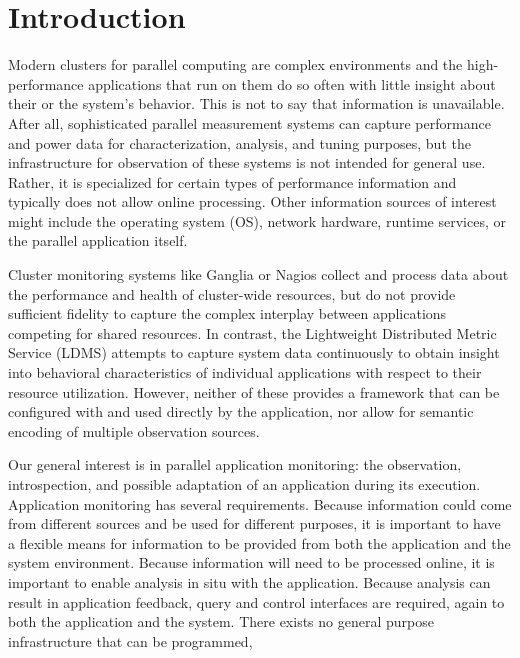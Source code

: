 \section{Introduction}
%
\par
%
Modern clusters for parallel computing are complex environments and
the high-performance applications that run on them do so often with
little insight about their or the system's behavior.
%
This is not to say that information is unavailable.  After all,
sophisticated parallel measurement systems can capture performance and
power data for characterization, analysis, and tuning purposes, but
the infrastructure for observation of these systems is not intended
for general use.
%
Rather, it is specialized for certain types of performance information
and typically does not allow online processing.
%
Other information sources of interest might include the
operating system (OS), network hardware, runtime services, or the
parallel application itself.
%
\par
%
Cluster monitoring systems like Ganglia \cite{massie2004ganglia} or
Nagios \cite{katsaros2011building} collect and process data about the
performance and health of cluster-wide resources, but do not provide
sufficient fidelity to capture the complex interplay between
applications competing for shared resources.
%
In contrast, the Lightweight Distributed Metric Service
\cite{agelastos2014lightweight} (LDMS) attempts to capture system data
continuously to obtain insight into behavioral characteristics of
individual applications with respect to their resource utilization.
%
However, neither of these provides a framework that can be configured
with and used directly by the application, nor allow for semantic
encoding of multiple observation sources.
%
\par
%
Our general interest is in parallel application monitoring: the
observation, introspection, and possible adaptation of an application
during its execution.
%
Application monitoring has several requirements.
%
Because information could come from different sources and be used for
different purposes, it is important to have a flexible means for
information to be provided from both the application and the system
environment.
%
Because information will need to be processed online, it is important
to enable analysis in situ with the application.
%
Because analysis can result in application feedback, query and control
interfaces are required, again to both the application and the system.
%
There exists no general purpose infrastructure that can be programmed,
